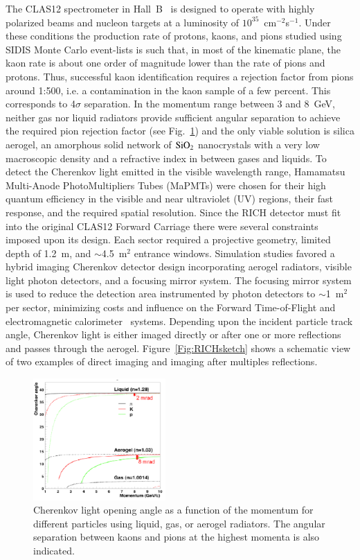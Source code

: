 \documentclass[5p,times,twocolumn]{elsarticle}
\begin{document}
The CLAS12 spectrometer in Hall~B~\cite{overview-nim} is designed to operate with highly polarized beams and
nucleon targets at a luminosity of $10^{35}$~cm$^{-2}$s$^{-1}$. Under these conditions the production rate of protons,
kaons, and pions studied using SIDIS Monte Carlo event-lists is such that, in most of the kinematic plane, the kaon rate
is about one order of magnitude lower than the rate of pions and protons. Thus, successful kaon identification requires
a rejection factor from pions around 1:500, i.e. a contamination in the kaon sample of a few percent. This corresponds to
4$\sigma$ separation. In the momentum range between 3 and 8~GeV, neither gas nor liquid radiators provide sufficient
angular separation to achieve the required pion rejection factor (see Fig.~\ref{Fig:Radiators}) and the only viable
solution is silica aerogel, an amorphous solid network of $\rm SiO_2$ nanocrystals with a very low macroscopic density
and a refractive index in between gases and liquids. To detect the Cherenkov light emitted in the visible wavelength
range, Hamamatsu Multi-Anode PhotoMultipliers Tubes (MaPMTs) were chosen for their high quantum efficiency in the
visible and near ultraviolet (UV) regions, their fast response, and the required spatial resolution. Since the RICH
detector must fit into the original CLAS12 Forward Carriage there were several constraints imposed upon its design.
Each sector required a projective geometry, limited depth of 1.2~m, and $\sim$4.5~m$^2$ entrance windows.
Simulation studies favored a hybrid imaging Cherenkov detector design incorporating aerogel radiators, visible light
photon detectors, and a focusing mirror system. The focusing mirror system is used to reduce the detection area
instrumented by photon detectors to $\sim$1~m$^2$ per sector, minimizing costs and influence on the Forward
Time-of-Flight and electromagnetic calorimeter~\cite{ecal-nim} systems. Depending upon the incident particle track
angle, Cherenkov light is either imaged directly or after one or more reflections and passes through the aerogel.
Figure~\ref{Fig:RICHsketch} shows a schematic view of two examples of direct imaging and imaging after multiples
reflections.

\begin{figure}
\begin{center}
\includegraphics[width=0.45\textwidth]{Radiators.pdf}
\caption{Cherenkov light opening angle as a function of the momentum for different particles using liquid, gas, or
  aerogel radiators. The angular separation between kaons and pions at the highest momenta is also indicated.}
\label{Fig:Radiators}
\end{center}
\end{figure}
\end{document}
